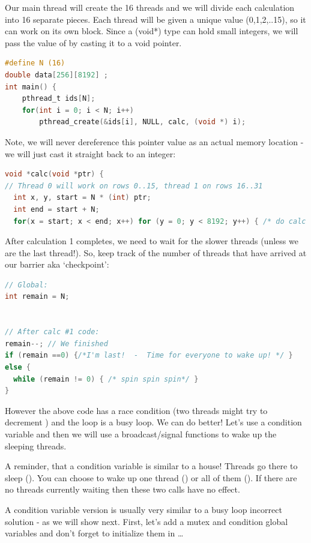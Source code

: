 Our main thread will create the 16 threads and we will divide each calculation into 16 separate pieces. Each thread will be given a unique value (0,1,2,..15), so it can work on its own block. Since a (void*) type can hold small integers, we will pass the value of  by casting it to a void pointer.

\begin{lstlisting}[language=C]
#define N (16)
double data[256][8192] ;
int main() {
    pthread_t ids[N];
    for(int i = 0; i < N; i++)  
        pthread_create(&ids[i], NULL, calc, (void *) i);
\end{lstlisting}

Note, we will never dereference this pointer value as an actual memory location - we will just cast it straight back to an integer:

\begin{lstlisting}[language=C]
void *calc(void *ptr) {
// Thread 0 will work on rows 0..15, thread 1 on rows 16..31
  int x, y, start = N * (int) ptr;
  int end = start + N; 
  for(x = start; x < end; x++) for (y = 0; y < 8192; y++) { /* do calc #1 */ }
\end{lstlisting}

After calculation 1 completes, we need to wait for the slower threads (unless we are the last thread!). So, keep track of the number of threads that have arrived at our barrier aka `checkpoint':

\begin{lstlisting}[language=C]
// Global: 
int remain = N;


// After calc #1 code:
remain--; // We finished
if (remain ==0) {/*I'm last!  -  Time for everyone to wake up! */ }
else {
  while (remain != 0) { /* spin spin spin*/ }
}
\end{lstlisting}

However the above code has a race condition (two threads might try to decrement ) and the loop is a busy loop. We can do better! Let's use a condition variable and then we will use a broadcast/signal functions to wake up the sleeping threads.

A reminder, that a condition variable is similar to a house! Threads go there to sleep (). You can choose to wake up one thread () or all of them (). If there are no threads currently waiting then these two calls have no effect.

A condition variable version is usually very similar to a busy loop incorrect solution - as we will show next. First, let's add a mutex and condition global variables and don't forget to initialize them in  \ldots{}

